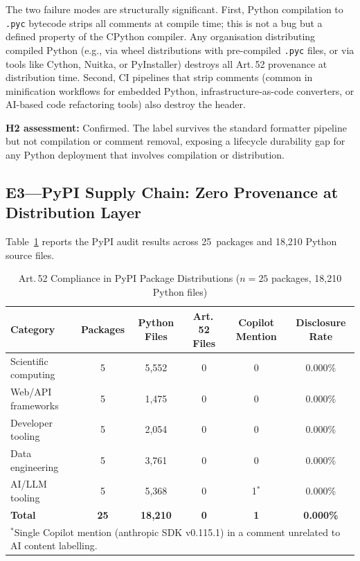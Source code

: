 \documentclass[conference]{IEEEtran}
\begin{document}
The two failure modes are structurally significant.  First, Python
compilation to \texttt{.pyc} bytecode strips all comments at compile
time; this is not a bug but a defined property of the CPython compiler.
Any organisation distributing compiled Python (e.g., via wheel
distributions with pre-compiled \texttt{.pyc} files, or via tools like
Cython, Nuitka, or PyInstaller) destroys all Art.\,52 provenance at
distribution time.  Second, CI pipelines that strip comments (common in
minification workflows for embedded Python, infrastructure-as-code
converters, or AI-based code refactoring tools) also destroy the header.

\textbf{H2 assessment:} Confirmed.  The label survives the standard
formatter pipeline but not compilation or comment removal, exposing a
lifecycle durability gap for any Python deployment that involves
compilation or distribution.

\subsection{E3---PyPI Supply Chain: Zero Provenance at Distribution Layer}

Table~\ref{tab:pypi} reports the PyPI audit results across 25~packages
and 18,210 Python source files.

\begin{table}[htbp]
\caption{Art.\,52 Compliance in PyPI Package Distributions
         ($n = 25$ packages, 18,210 Python files)}
\label{tab:pypi}
\begin{center}
\begin{tabular}{lccccc}
\toprule
Category & Packages & Python Files & Art.\,52 Files &
  Copilot Mention & Disclosure Rate \\
\midrule
Scientific computing & 5 & 5,552 & 0 & 0 & 0.000\% \\
Web/API frameworks   & 5 & 1,475 & 0 & 0 & 0.000\% \\
Developer tooling    & 5 & 2,054 & 0 & 0 & 0.000\% \\
Data engineering     & 5 & 3,761 & 0 & 0 & 0.000\% \\
AI/LLM tooling       & 5 & 5,368 & 0 & 1$^{*}$ & 0.000\% \\
\midrule
\textbf{Total} & \textbf{25} & \textbf{18,210} & \textbf{0} &
  \textbf{1} & \textbf{0.000\%} \\
\bottomrule
\multicolumn{6}{l}{\footnotesize $^{*}$Single Copilot mention (anthropic SDK
  v0.115.1) in a comment unrelated to AI content labelling.}
\end{tabular}
\end{center}
\end{table}
\end{document}
